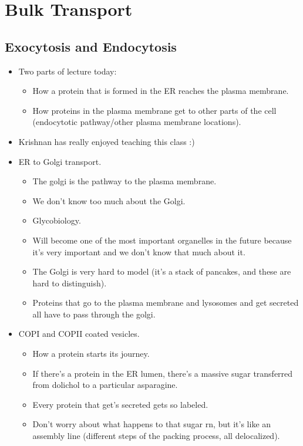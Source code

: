 \documentclass[../notes.tex]{subfiles}
\begin{document}
\chapter{Bulk Transport}
\section{Exocytosis and Endocytosis}
\begin{itemize}
    \item {}Two parts of lecture today:
    \begin{itemize}
        \item How a protein that is formed in the ER reaches the plasma membrane.
        \item How proteins in the plasma membrane get to other parts of the cell (endocytotic pathway/other plasma membrane locations).
    \end{itemize}
    \item Krishnan has really enjoyed teaching this class :)
    \item ER to Golgi transport.
    \begin{itemize}
        \item The golgi is the pathway to the plasma membrane.
        \item We don't know too much about the Golgi.
        \item Glycobiology.
        \item Will become one of the most important organelles in the future because it's very important and we don't know that much about it.
        \item The Golgi is very hard to model (it's a stack of pancakes, and these are hard to distinguish).
        \item Proteins that go to the plasma membrane and lysosomes and get secreted all have to pass through the golgi.
    \end{itemize}
    \item COPI and COPII coated vesicles.
    \begin{itemize}
        \item How a protein starts its journey.
        \item If there's a protein in the ER lumen, there's a massive sugar transferred from dolichol to a particular asparagine.
        \item Every protein that get's secreted gets so labeled.
        \item Don't worry about what happens to that sugar rn, but it's like an assembly line (different steps of the packing process, all delocalized).

\end{itemize}
\end{itemize}
\end{document}
